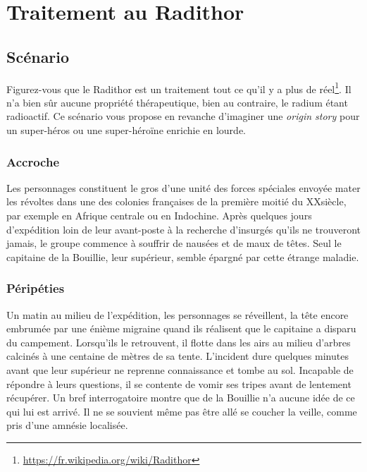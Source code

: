 \chapter{Traitement au Radithor}

\section{Scénario}

Figurez-vous que le Radithor est un traitement tout ce qu'il y a plus de réel\footnote{\url{https://fr.wikipedia.org/wiki/Radithor}}. Il n'a bien sûr aucune propriété thérapeutique, bien au contraire, le radium étant radioactif.
Ce scénario vous propose en revanche d'imaginer une \emph{origin story} pour un super-héros ou une super-héroïne enrichie en lourde.

\subsection{Accroche}

Les personnages constituent le gros d'une unité des forces spéciales envoyée mater les révoltes dans une des colonies françaises de la première moitié du XX\ieme siècle, par exemple en Afrique centrale ou en Indochine.
Après quelques jours d'expédition loin de leur avant-poste à la recherche d'insurgés qu'ils ne trouveront jamais, le groupe commence à souffrir de nausées et de maux de têtes.
Seul le capitaine de la Bouillie, leur supérieur, semble épargné par cette étrange maladie.

\subsection{Péripéties}

Un matin au milieu de l'expédition, les personnages se réveillent, la tête encore embrumée par une énième migraine quand ils réalisent que le capitaine a disparu du campement.
Lorsqu'ils le retrouvent, il flotte dans les airs au milieu d'arbres calcinés à une centaine de mètres de sa tente.
L'incident dure quelques minutes avant que leur supérieur ne reprenne connaissance et tombe au sol.
Incapable de répondre à leurs questions, il se contente de vomir ses tripes avant de lentement récupérer.
Un bref interrogatoire montre que de la Bouillie n'a aucune idée de ce qui lui est arrivé. Il ne se souvient même pas être allé se coucher la veille, comme pris d'une amnésie localisée.

